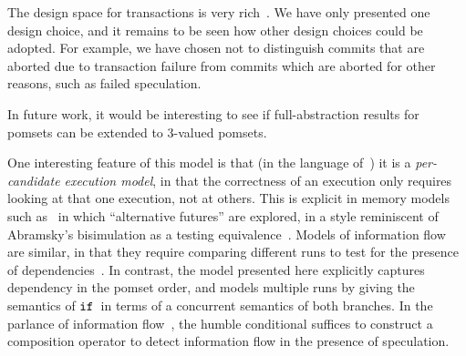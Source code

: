 The design space for transactions is very rich~\cite{DBLP:journals/pacmpl/DongolJR18}.
We have only presented one design choice, and it remains to be seen how other
design choices could be adopted. For example, we have chosen not to distinguish
commits that are aborted due to transaction failure from commits which are aborted
for other reasons, such as failed speculation.

In future work, it would be interesting to see if full-abstraction
results for pomsets \cite{Plotkin:1997:TSP:266557.266600} can be extended to
3-valued pomsets.

One interesting feature of this model is that (in the language
of~\cite{Pichon-Pharabod:2016:CSR:2837614.2837616}) it is a
\emph{per-candidate execution model}, in that the correctness of an
execution only requires looking at that one execution, not at
others. This is explicit in memory models such
as~\cite{Jagadeesan:2010:GOS:2175486.2175503,Kang:2017:PSR:3009837.3009850} in which
``alternative futures'' are explored, in a style reminiscent of
Abramsky's bisimulation as a testing equivalence~\cite{ABRAMSKY1987225}. Models of
information flow are similar, in that they require comparing different
runs to test for the presence of dependencies~\cite{Clarkson:2010:HYP:1891823.1891830}. In contrast, the model
presented here explicitly captures dependency in the pomset order, and
models multiple runs by giving the semantics of $\texttt{if}\,$ in terms of a
concurrent semantics of both branches.
In the parlance of information flow~\cite{Barthe:2004:SIF:1009380.1009669},
the humble conditional suffices to construct a composition operator to detect information flow  in the presence of speculation.
